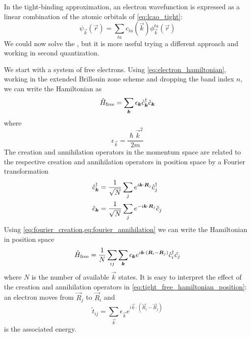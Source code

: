In the tight-binding approximation, an electron wavefunction is expressed as a linear combination of the atomic orbitals of \cref{eq:lcao_tight}:
\begin{equation} \label{eq:lcao}
    \psi_\vec{k}(\vec{r}) = \sum_{ta} c_{ta}(\vec{k}) \phi_\vec{k}^{ta}(\vec{r})
\end{equation}
We could now solve the \sche, but it is more useful trying a different approach and working in second quantization.

We start with a system of free electrons. Using \cref{eq:electron_hamiltonian}, working in the extended Brillouin zone scheme and dropping the band index $n$, we can write the Hamiltonian as
\begin{equation}
    \hat{H}_\text{free} = \sum_{\mathbf{\boldsymbol{k}}} \epsilon_{\mathbf{\boldsymbol{k}}} \hat{c}^\dagger_{\mathbf{\boldsymbol{k}}}\hat{c}_{\mathbf{\boldsymbol{k}}}
\end{equation}
where
\begin{equation} \label{eq:tight_free_disperion}
    \epsilon_{\vec{k}} = \frac{\hslash\vec{k}^2}{2m}
\end{equation}
The creation and annihilation operators in the momentum space are related to the respective creation and annihilation operators in position space by a Fourier transformation
\begin{align} \label{eq:fourier_creation}
    \hat{c}^\dagger_{\mathbf{\boldsymbol{k}}} & = \frac{1}{\sqrt{N}} \sum_j e^{i\mathbf{\boldsymbol{k}}\cdot\mathbf{\boldsymbol{R}}_j} \hat{c}^\dagger_j \\ \label{eq:fourier_annihilation}
    \hat{c}_{\mathbf{\boldsymbol{k}}}  & = \frac{1}{\sqrt{N}} \sum_j e^{-i\mathbf{\boldsymbol{k}}\cdot\mathbf{\boldsymbol{R}}_j} \hat{c}_j
\end{align}
Using \cref{eq:fourier_creation,eq:fourier_annihilation} we can write the Hamiltonian in position space
\begin{equation} \label{eq:tight_free_hamiltonian_position}
    \hat{H}_\text{free} = \frac{1}{N} \sum_{ij} \sum_{\mathbf{\boldsymbol{k}}} \epsilon_{\mathbf{\boldsymbol{k}}} e^{i\mathbf{\boldsymbol{k}}\cdot(\mathbf{\boldsymbol{R}}_i - \mathbf{\boldsymbol{R}}_j)} \hat{c}^\dagger_i\hat{c_j}
\end{equation}
where $N$ is the number of available $\vec{k}$ states. It is easy to interpret the effect of the creation and annihilation operators in \cref{eq:tight_free_hamiltonian_position}: an electron moves from $\vec{R}_j$ to $\vec{R}_i$ and
\begin{equation}
    \tilde{t}_{ij} = \sum_\vec{k} \epsilon_{\vec{k}} e^{i\vec{k}\cdot(\vec{R}_i - \vec{R}_j)}
\end{equation}
is the associated energy.

